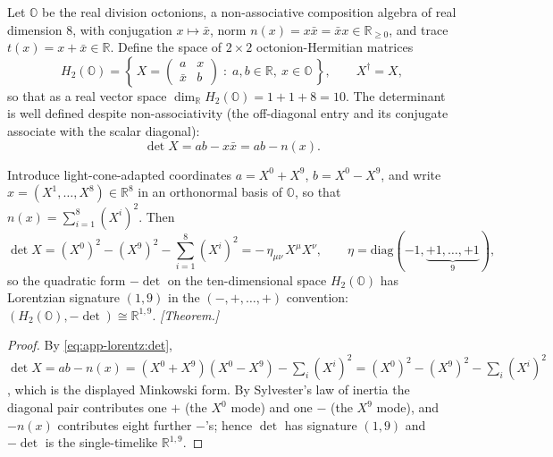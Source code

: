 Let $\mathbb{O}$ be the real division octonions, a non-associative composition
algebra of real dimension $8$, with conjugation $x\mapsto\bar{x}$, norm
$n(x)=x\bar{x}=\bar{x}x\in\mathbb{R}_{\ge0}$, and trace $t(x)=x+\bar{x}\in\mathbb{R}$.
Define the space of $2\times2$ octonion-Hermitian matrices
\begin{equation}
\label{eq:app-lorentz:h2def}
H_{2}(\mathbb{O})
 =\left\{\,X=\begin{pmatrix} a & x \\ \bar{x} & b \end{pmatrix}
   \;:\; a,b\in\mathbb{R},\ x\in\mathbb{O}\,\right\},
 \qquad X^{\dagger}=X,
\end{equation}
so that as a real vector space
$\dim_{\mathbb{R}}H_{2}(\mathbb{O})=1+1+8=10$. The determinant is well defined
despite non-associativity (the off-diagonal entry and its conjugate associate with
the scalar diagonal):
\begin{equation}
\label{eq:app-lorentz:det}
\det X = ab-x\bar{x}=ab-n(x).
\end{equation}

\begin{theorem}[Minkowski identification; \texorpdfstring{$H_{2}(\mathbb{O})\cong\mathbb{R}^{1,9}$}{H2(O)=R(1,9)}]
\label{thm:app-lorentz:Mink}
Introduce light-cone-adapted coordinates $a=X^{0}+X^{9}$, $b=X^{0}-X^{9}$, and write
$x=(X^{1},\dots,X^{8})\in\mathbb{R}^{8}$ in an orthonormal basis of $\mathbb{O}$, so
that $n(x)=\sum_{i=1}^{8}(X^{i})^{2}$. Then
\begin{equation}
\label{eq:app-lorentz:detmink}
\det X = (X^{0})^{2}-(X^{9})^{2}-\sum_{i=1}^{8}(X^{i})^{2}
       = -\,\eta_{\mu\nu}\,X^{\mu}X^{\nu},
\qquad
\eta=\mathrm{diag}(-1,\underbrace{+1,\dots,+1}_{9}),
\end{equation}
so the quadratic form $-\det$ on the ten-dimensional space $H_{2}(\mathbb{O})$ has
Lorentzian signature $(1,9)$ in the $(-,+,\dots,+)$ convention:
$(H_{2}(\mathbb{O}),-\det)\cong\mathbb{R}^{1,9}$. \emph{[Theorem.]}
\end{theorem}

\begin{proof}
By \eqref{eq:app-lorentz:det},
$\det X=ab-n(x)=(X^{0}+X^{9})(X^{0}-X^{9})-\sum_{i}(X^{i})^{2}
=(X^{0})^{2}-(X^{9})^{2}-\sum_{i}(X^{i})^{2}$, which is the displayed Minkowski
form. By Sylvester's law of inertia the diagonal pair contributes one $+$ (the
$X^{0}$ mode) and one $-$ (the $X^{9}$ mode), and $-n(x)$ contributes eight further
$-$'s; hence $\det$ has signature $(1,9)$ and $-\det$ is the single-timelike
$\mathbb{R}^{1,9}$.
\end{proof}

